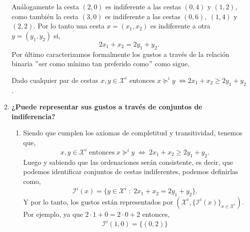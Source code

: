 \begin{enumerate}
\begin{center}
	\end{center}
	\vspace{.5cm}

	Análogamente la cesta $(2,0)$ es indiferente a las cestas $(0,4)$ y $(1,2)$, como también la cesta $(3,0)$ es indiferente a las cestas $(0,6),\; (1,4)$ y $(2,2)$. Por lo tanto una cesta $x=(x_1,x_2)$ es indiferente a otra $y=(y_1,y_2)$ si, $$2x_1 + x_2 = 2y_1 + y_2.$$
	Por último caracterizamos formalmente los gustos a través de la relación binaria $"$ser como mínimo tan preferido como$"$ como sigue,
	\begin{center}
	    Dado cualquier par de cestas $x,y \in \mathcal{X}^i$ entonces $x \succeq^i y \; \Longleftrightarrow 2x_1 + x_2 \geq 2y_1 + y_2$.
	\end{center}
	\vspace{.5cm}

    \item \textbf{¿Puede representar sus gustos a través de conjuntos de indiferencia?}\\

	\begin{enumerate}[\bfseries (2.1)]

	    \item Siendo que cumplen los axiomas de completitud y transitividad, tenemos que,
		$$x,y\in \mathcal{X}^i \; \mbox{entonces} \; x\succeq^i y \; \Longleftrightarrow \; 2x_1+x_2 \geq 2y_1+y_2.$$
		Luego y sabiendo que las ordenaciones serán consistente, es decir, que podemos identificar conjuntos de cestas indiferentes, podemos definirlas como, 
		$$\mathcal{I}^i(x) = \lbrace y\in \mathcal{X}^i\; : \;  2x_1 + x_2 = 2y_1 + y_2\rbrace.$$
		Y por lo tanto, los gustos están representados por $\left(\mathcal{X}^i,\lbrace \mathcal{I}^i(x)\rbrace_{x\in \mathcal{X}^i}\right)$. Por ejemplo, ya que $2\cdot 1 + 0 = 2\cdot 0 + 2$ entonces,
		$$\mathcal{I}^i (1,0) = \lbrace (0,2) \rbrace$$
		

\end{enumerate}
\end{enumerate}
